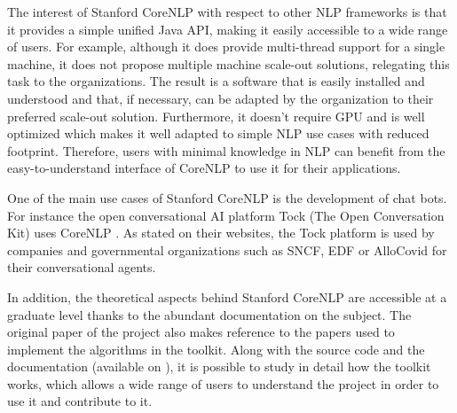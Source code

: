 \documentclass{classeENS}
\begin{document}
The interest of Stanford CoreNLP with respect to other NLP frameworks is that it provides a simple unified Java API, making it easily accessible to a wide range of users. For example, although it does provide multi-thread support for a single machine, it does not propose multiple machine scale-out solutions, relegating this task to the organizations. The result is a software that is easily installed and understood and that, if necessary, can be adapted by the organization to their preferred scale-out solution. Furthermore, it doesn't require GPU and is well optimized which makes it well adapted to simple NLP use cases with reduced footprint. Therefore, users with minimal knowledge in NLP can benefit from the easy-to-understand interface of CoreNLP to use it for their applications. 

One of the main use cases of Stanford CoreNLP is the development of chat bots. For instance the open conversational AI platform Tock (The Open Conversation Kit) uses CoreNLP \cite{Tock}. As stated on their websites, the Tock platform is used by companies and governmental organizations such as SNCF, EDF or AlloCovid for their conversational agents.

In addition, the theoretical aspects behind Stanford CoreNLP are accessible at a graduate level thanks to the abundant documentation on the subject. The original paper of the project also makes reference to the papers used to implement the algorithms in the toolkit. Along with the source code and the documentation (available on \cite{CoreNLPUsage}), it is possible to study in detail how the toolkit works, which allows a wide range of users to understand the project in order to use it and contribute to it.



\end{document}
